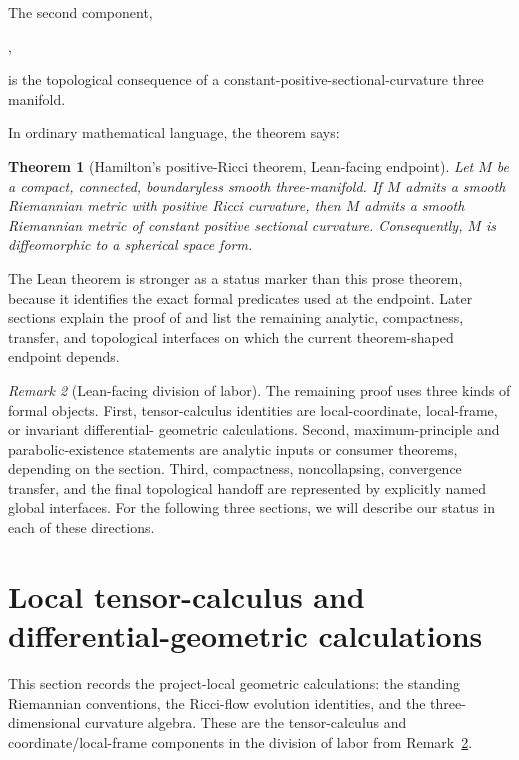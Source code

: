 \documentclass[11pt]{article}
\theoremstyle{plain}
\newtheorem{theorem}{Theorem}[section]
\theoremstyle{definition}
\theoremstyle{remark}
\newtheorem{remark}[theorem]{Remark}
\begin{document}
The second component,
\begin{center}
\texttt{},
\end{center}
is the topological consequence of a constant-positive-sectional-curvature three manifold.

In ordinary mathematical language, the theorem says:

\begin{theorem}[Hamilton's positive-Ricci theorem, Lean-facing endpoint]
\label{thm:main-hamilton-3d-lean-facing}
Let \(M\) be a compact, connected, boundaryless smooth three-manifold.  If
\(M\) admits a smooth Riemannian metric with positive Ricci curvature, then
\(M\) admits a smooth Riemannian metric of constant positive sectional
curvature.  Consequently, \(M\) is diffeomorphic to a spherical space form.
\end{theorem}

The Lean theorem is stronger as a status marker than this prose theorem,
because it identifies the exact formal predicates used at the endpoint.  Later
sections explain the proof of \texttt{} and list
the remaining analytic, compactness, transfer, and topological interfaces on
which the current theorem-shaped endpoint depends.


\begin{remark}[Lean-facing division of labor]
\label{rem:lean-division-of-labor}
The remaining proof uses three kinds of formal objects.  First, tensor-calculus
identities are local-coordinate, local-frame, or invariant differential-
geometric calculations.  Second, maximum-principle and parabolic-existence
statements are analytic inputs or consumer theorems, depending on the section.
Third, compactness, noncollapsing, convergence transfer, and the final
topological handoff are represented by explicitly named global interfaces.
For the following three sections, we will describe our status in each of these directions.
\end{remark}

\section{Local tensor-calculus and differential-geometric calculations}
\label{sec:local-tensor-geometry}

This section records the project-local geometric calculations: the standing
Riemannian conventions, the Ricci-flow evolution identities, and the
three-dimensional curvature algebra.  These are the tensor-calculus and
coordinate/local-frame components in the division of labor from
Remark~\ref{rem:lean-division-of-labor}.
\end{document}
